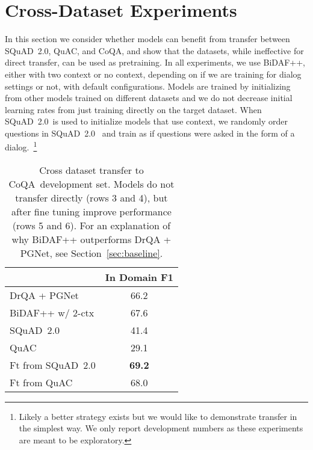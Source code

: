 \documentclass[11pt,a4paper]{article}
\newcommand{\quact}[0]{QuAC}
\newcommand{\coqa}[0]{CoQA}
\newcommand{\squad}[0]{SQuAD~2.0}
\begin{document}
\section{Cross-Dataset Experiments}
\label{sec:results}
In this section we consider whether models can benefit from transfer between \squad, \quact, and \coqa, and show that the datasets, while ineffective for direct transfer, can be used as pretraining.
In all experiments, we use BiDAF++, either with two context or no context, depending on if we are training for dialog settings or not, with default configurations.
Models are trained by initializing from other models trained on different datasets and we do not decrease initial learning rates from just training directly on the target dataset.
When \squad~is used to initialize models that use context, we randomly order questions in \squad~ and train as if questions were asked in the form of a dialog.~\footnote{Likely a better strategy exists but we would like to demonstrate transfer in the simplest way. We only report development numbers as these experiments are meant to be exploratory.}






\begin{table}[t]
 \small

    \centering
    \begin{tabular}{l|c}
    
     & In Domain F1   \\
    \midrule
    DrQA + PGNet & 66.2 \\
    BiDAF++ w/ 2-ctx & 67.6 \\
    \midrule 
    \squad & 41.4  \\
    \quact & 29.1  \\
    Ft from \squad & \bf{69.2}  \\
    Ft from \quact & 68.0 \\
    \end{tabular}
    \vspace{-7pt}
    \caption{Cross dataset transfer to \coqa~development set. Models do not transfer directly (rows 3 and 4), but after fine tuning improve performance (rows 5 and 6). For an explanation of why BiDAF++ outperforms DrQA + PGNet, see Section~\ref{sec:baseline}.}
        \vspace{-7pt}

    \label{tab:coqa_experiments}
\end{table}
\end{document}
